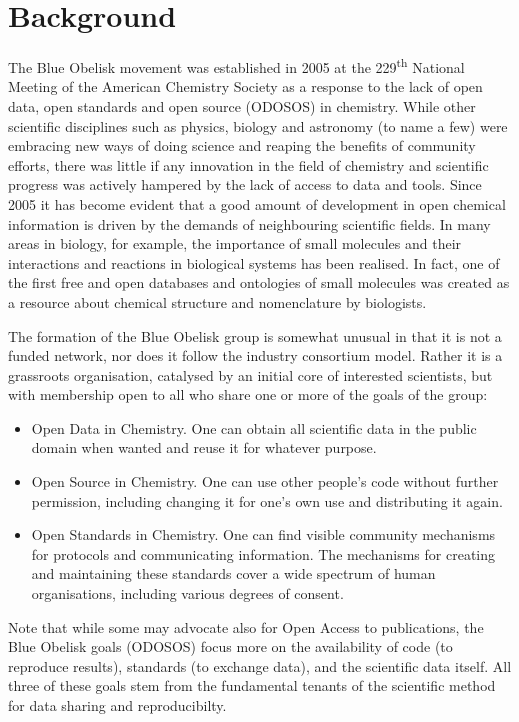 \documentclass[10pt]{bmc_article}
\newenvironment{bmcformat}{\fussy\setboolean{publ}{true}}{\fussy}
\begin{document}
\begin{bmcformat}
\section*{Background}
The Blue Obelisk movement was established in 2005 at the
229\textsuperscript{th} National Meeting of the American Chemistry
Society as a response to the lack of open data, open standards and
open source (ODOSOS) in chemistry. While other scientific disciplines
such as physics, biology and astronomy (to name a few) were embracing
new ways of doing science and reaping the benefits of community
efforts, there was little if any innovation in the field of chemistry
and scientific progress was actively hampered by the lack of access to
data and tools.
Since 2005 it has become evident that a good amount of development in open
chemical information is driven by the demands of neighbouring
scientific fields. In many areas in biology, for example, the importance of
small molecules and their interactions and reactions in biological systems
has been realised. In fact, one of the first free and open databases and ontologies
of small molecules was created as a resource about chemical structure and nomenclature
by biologists.\cite{DeMatos:2009p3839}

The formation of the Blue Obelisk group is somewhat unusual in that it
is not a funded network, nor does it follow the industry consortium
model. Rather it is a grassroots organisation, catalysed by an initial
core of interested scientists, but with membership open to all who
share one or more of the goals of the group:
\begin{itemize}
\item Open Data in Chemistry. One can obtain all scientific data in the public domain when
wanted and reuse it for whatever purpose.
\item Open Source in Chemistry. One can use other people's code without further
permission, including changing it for one's own use and distributing
it again.
\item Open Standards in Chemistry. One can find visible community mechanisms for
protocols and communicating information. The mechanisms for creating
and maintaining these standards cover a wide spectrum of human
organisations, including various degrees of consent.
\end{itemize}

Note that while some may advocate also for Open Access to
publications, the Blue Obelisk goals (ODOSOS) focus more on the availability of code (to
reproduce results), standards (to exchange data), and the scientific
data itself. All three of these goals stem from the fundamental
tenants of the scientific method for data sharing and reproducibilty.


\end{bmcformat}
\end{document}
